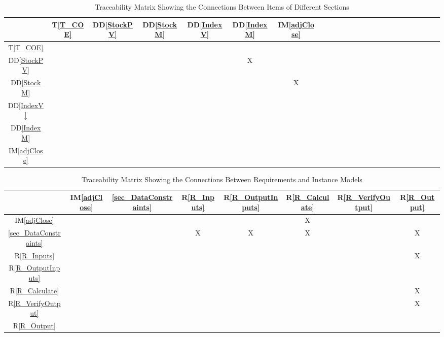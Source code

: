 \documentclass[12pt]{article}
\newcommand{\ddref}[1]{DD\ref{#1}}
\newcommand{\tref}[1]{T\ref{#1}}
\newcommand{\iref}[1]{IM\ref{#1}}
\newcommand{\rref}[1]{R\ref{#1}}
\begin{document}
\begin{table}[h!]
\centering
\begin{tabular}{|c|c|c|c|c|c|c|c|c|c|c|c|c|c|c|c|c|c|c|c|c|c|c|c|}
\hline 
& \tref{T_COE}& \ddref{StockPV}& \ddref{StockM} & \ddref{IndexV}& \ddref{IndexM} & \iref{adjClose} \\
\hline
\tref{T_COE} & & & & & & & \\ \hline
\ddref{StockPV} & & & & &X & &\\ \hline
\ddref{StockM} & & & & & &X &\\ \hline
\ddref{IndexV} & & & & & & & \\ \hline
\ddref{IndexM} & & & & & & &\\ \hline
\iref{adjClose} & & & & & & &\\ \hline


\end{tabular}
\caption{Traceability Matrix Showing the Connections Between Items of Different Sections}
\label{Table:trace}
\end{table}

\begin{table}[h!]
\centering
\begin{tabular}{|c|c|c|c|c|c|c|c|}
\hline
& \iref{adjClose}& \ref{sec_DataConstraints}& \rref{R_Inputs}& \rref{R_OutputInputs} & \rref{R_Calculate}& \rref{R_VerifyOutput}& \rref{R_Output} \\
\hline
\iref{adjClose} & & & & &X & & \\ \hline
\ref{sec_DataConstraints} & & &X &X & X& &X \\ \hline
\rref{R_Inputs} & & & & & & &X \\ \hline
\rref{R_OutputInputs} & & & & & & & \\ \hline
\rref{R_Calculate} & & & & & & &X \\ \hline
\rref{R_VerifyOutput} & & & & & & &X \\ \hline
\rref{R_Output} & & & & & & & \\ \hline 

\hline
\end{tabular}
\caption{Traceability Matrix Showing the Connections Between Requirements and Instance Models}
\label{Table:R_trace}
\end{table}
\end{document}
